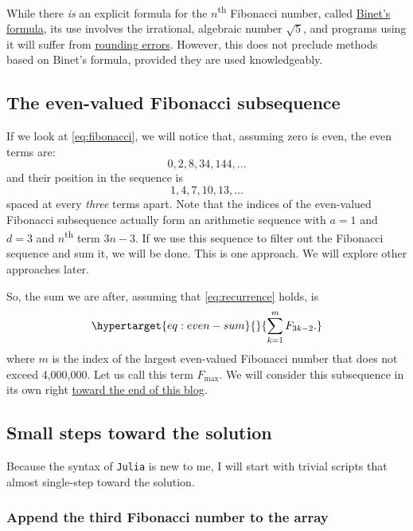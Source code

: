 \documentclass[
  a4paper,
]{article}
\begin{document}
While there \emph{is} an explicit formula for the
\(n\)\textsuperscript{th} Fibonacci number, called
\href{https://artofproblemsolving.com/wiki/index.php/Binet\%27s_Formula}{Binet's
formula}, its use involves the irrational, algebraic number \(\sqrt5\),
and programs using it will suffer from
\href{https://www.cs.drexel.edu/~popyack/Courses/CSP/Fa17/extras/Rounding/index.html}{rounding
errors}. However, this does not preclude methods based on Binet's
formula, provided they are used knowledgeably.

\hypertarget{the-even-valued-fibonacci-subsequence}{%
\subsection{The even-valued Fibonacci
subsequence}\label{the-even-valued-fibonacci-subsequence}}

If we look at \cref{eq:fibonacci}, we will notice that, assuming zero is
even, the even terms are: \[
0, 2, 8, 34, 144, \ldots
\] and their position in the sequence is \[
1, 4, 7, 10, 13, \ldots
\] spaced at every \emph{three} terms apart. Note that the indices of
the even-valued Fibonacci subsequence actually form an arithmetic
sequence with \(a = 1\) and \(d = 3\) and \(n\)\textsuperscript{th} term
\(3n - 3\). If we use this sequence to filter out the Fibonacci sequence
and sum it, we will be done. This is one approach. We will explore other
approaches later.

So, the sum we are after, assuming that \cref{eq:recurrence} holds, is
\begin{equation}\protect\hypertarget{eq:even-sum}{}{
\sum_{k=1}^{m}F_{3k-2}.
}\label{eq:even-sum}\end{equation} where \(m\) is the index of the
largest even-valued Fibonacci number that does not exceed 4,000,000. Let
us call this term \(F_{\max}\). We will consider this subsequence in its
own right \protect\hyperlink{a-second-look-at-the-problem}{toward the
end of this blog}.

\hypertarget{small-steps-toward-the-solution}{%
\subsection{Small steps toward the
solution}\label{small-steps-toward-the-solution}}

Because the syntax of \texttt{Julia} is new to me, I will start with
trivial scripts that almost single-step toward the solution.

\hypertarget{append-the-third-fibonacci-number-to-the-array}{%
\subsubsection{Append the third Fibonacci number to the
array}\label{append-the-third-fibonacci-number-to-the-array}}
\end{document}

